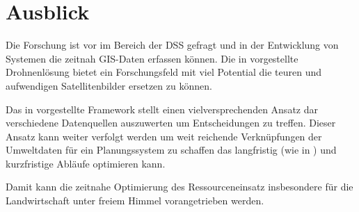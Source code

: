 \section{Ausblick}

Die Forschung ist vor im Bereich der DSS gefragt und in der Entwicklung von Systemen die zeitnah GIS-Daten erfassen können. Die in \cite{jour:Honkavaara2012} vorgestellte Drohnenlösung bietet ein Forschungsfeld mit viel Potential die teuren und aufwendigen Satellitenbilder ersetzen zu können.

Das in \cite{jour:Dutta2014} vorgestellte Framework stellt einen vielversprechenden Ansatz dar verschiedene Datenquellen auszuwerten um Entscheidungen zu treffen. Dieser Ansatz kann weiter verfolgt werden um weit reichende Verknüpfungen der Umweltdaten für ein Planungssystem zu schaffen das langfristig (wie in \cite{jour:Wenkel2011}) und kurzfristige Abläufe optimieren kann.

Damit kann die zeitnahe Optimierung des Ressourceneinsatz insbesondere für die Landwirtschaft unter freiem Himmel vorangetrieben werden.